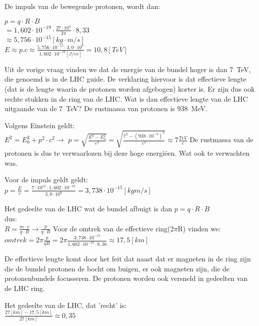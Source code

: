 \begin{questions}
\begin{solution}
De impuls van de bewegende protonen, wordt dan:

$ p = q \cdot R \cdot B $ \\
$   = 1,602 \cdot 10^{-19} \cdot \frac{27\cdot 10^3}{2\pi} \cdot 8,33 $ \\
$ \approx 5,756 \cdot 10^{-15} [kg\cdot m/s]$ \\
$ E \approx p.c \approx \frac{5,756 \cdot 10^{-15} \cdot 3,0 \cdot 10^8}{1,602 \cdot 10^{-19} [J/ev]} = 10,8 [TeV]$

\end{solution}

\question
Uit de vorige vraag vinden we dat de energie van de bundel hoger is dan \SI{7}{\tera\electronvolt},
die genoemd is in de LHC guide. De verklaring hiervoor is dat effectieve lengte (dat is de lengte waarin de protonen worden
afgebogen) korter is. Er zijn dus ook rechte stukken in de ring van de LHC.
Wat is dan effectieve lengte van de LHC uitgaande van de
\SI{7}{\tera\electronvolt}? De rustmassa van protonen is \SI{938}{\mega\electronvolt}.

\begin{solution}
Volgens Einstein geldt:\\
$E^2 = E_0^2 + p^2 \cdot c^2 \rightarrow $
$p = \sqrt{\frac{E^2 -E_0^2}{c^2}} = \sqrt{\frac{7^2 -(938 \cdot 10^{-3})^2}{c^2}} \approx 7\frac{TeV}{c}$
De rustmassa van de protonen is dus te verwaarlozen bij deze hoge energiëen. 
Wat ook te verwachten was. 

Voor de impuls geldt geldt: \\
$p = \frac{E}{c} = \frac{7 \cdot 10^{12} \cdot 1,602 \cdot 10^{-19}}{3,0 \cdot 10^8} = 3,738 \cdot 10^{-15} [kg m/s]$

Het gedeelte van de LHC wat de bundel afbuigt is dan 
$ p = q \cdot R \cdot B $ \\
dus: \\
$R = \frac{m \cdot v}{q \cdot B} \rightarrow \frac{p}{q\cdot B} $
Voor de omtrek van de effectieve ring(2$\pi$R) vinden we: \\

$omtrek = 2 \pi \frac{p}{qB} = 2 \pi \frac{3,738 \cdot 10^{-15}}{1,602 \cdot 10^{-19} \cdot 8,36} \approx 17,5 [km]$

De effectieve lengte komt door het feit dat naast dat er magneten in de ring zijn
die de bundel protonen de bocht om buigen, er ook magneten zijn, die de protonenbundels focusseren.
De protonen worden ook versneld in gedeelten van de LHC ring.

Het gedeelte van de LHC, dat 'recht' is: \\
$ \frac{27 [km] - 17,5 [km]}{27 [km]} \approx 0,35$
\end{solution}


\end{questions}
